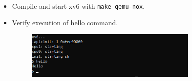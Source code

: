 \documentclass[a4paper]{article}
\begin{document}
\begin{itemize}
\begin{figure}[ht!]
			\end{figure}
		\item Compile and start xv6 with \verb|make qemu-nox|.
		\item Verify execution of hello command.
			\begin{figure}[ht!]
				\centering
				\includegraphics[width=0.8\textwidth]{5}
			\end{figure}
	\end{itemize}
	
\end{document}
